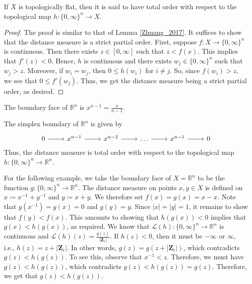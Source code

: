 \documentclass[a4paper,reqno,oneside]{article}
\begin{document}
\begin{lemma}
    If $X$ is topologically flat, then it is said to have total order with respect to the topological map $h: \{0,\infty\}^n \to X$.
\end{lemma}

\begin{proof}
    The proof is similar to that of Lemma \ref{Zhuang_2017}. It suffices to show that the distance measure is a strict partial order. 
    First, suppose $f: X \to \{0,\infty\}^n$ is continuous. Then there exists $z \in [0,\infty]$ such that $z < f(x)$. This implies that $f'(z) < 0$. Hence, $h$ is continuous and there exists $w_j \in \{0,\infty\}^n$ such that $w_j > z$. Moreover, if $w_i = w_j$, then $0 \leq h(w_i)$ for $i \neq j$. So, since $f(w_i) > z$, we see that $0 \leq f'(w_j)$. Thus, we get the distance measure being a strict partial order, as desired. 
\end{proof}

\begin{example}
    The boundary face of $\mathbb{R}^n$ is $x^{n-1} = \frac{x}{n-1}$.

    The simplex boundary of $\mathbb{R}^n$ is given by 
    \[\begin{tikzcd}
        0 \ar[r] & x^{n-1} \ar[r] & x^{n-2} \ar[r] & \dots \ar[r] & x^{n-1} \ar[r] & 0
    \end{tikzcd}\]
    Thus, the distance measure is total order with respect to the topological map $h: \{0,\infty\}^n \to \mathbb{R}^n$. 
\end{example}

For the following example, we take the boundary face of $X = \mathbb{R}^n$ to be the function $g: \{0,\infty\}^n \to \mathbb{R}^n$. 
The distance measure on points $x,y \in X$ is defined on $x \coloneqq x^{-1} + y^{-1}$ and $y \coloneqq x + y$. We therefore set $f(x) = g(x) = x - x$. Note that $g(x^{-1}) = g(x) = 0$ and $g(y) = y$. Since $|x| = |y| = 1$, it remains to show that $f(y) < f(x)$. This amounts to showing that $h(g(x)) < 0$ implies that $g(x) < h(g(x))$, as required. 
We know that $\mathcal{L}(h): \{0,\infty\}^n \to \mathbb{R}^n$ is continuous and $\mathcal{L}(h)(z) = \frac{g(z)}{|\mathbf{Z}_{\epsilon}|}$. If $h(z) < 0$, then it must be $-\infty$ or $\infty$, i.e., $h(z) = z + |\mathbf{Z}_{\epsilon}|$. In other words, $g(z) = g(z + |\mathbf{Z}_{\epsilon}|)$, which contradicts $g(z) < h(g(z))$. To see this, observe that $x^{-1} < z$. Therefore, we must have $g(z) < h(g(z))$, which contradicts $g(z) < h(g(z)) = g(z)$. Therefore, we get that $g(z) < h(g(z))$. 
\end{document}
